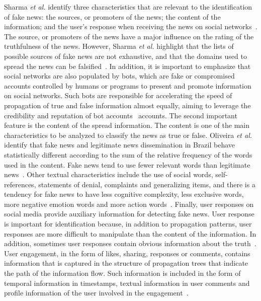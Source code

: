 \documentclass{ieeeaccess}
\begin{document}
Sharma {\it et al.} identify three characteristics that are relevant to the identification of fake news: the sources, or promoters of the news; the content of the information; and the user's response when receiving the news on social networks~\cite{sharma2019combating}. The source, or promoters of the news have a major influence on the rating of the truthfulness of the news. However, Sharma \textit{et al.} highlight that the lists of possible sources of fake news are not exhaustive, and that the domains used to spread the news can be falsified~\cite{sharma2019combating}. In addition, it is important to emphasize that social networks are also populated by bots, which are fake or compromised accounts controlled by humans or programs to present and promote information on social networks. Such bots are responsible for accelerating the speed of propagation of true and false information almost equally, aiming to leverage the credibility and reputation of bot accounts~\cite{botOrNot} accounts. The second important feature is the content of the spread information. The content is one of the main characteristics to be analyzed to classify the news as true or false. Oliveira {\it et al.} identify that fake news and legitimate news dissemination in Brazil behave statistically different according to the sum of the relative frequency of the words used in the content. Fake news tend to use fewer relevant words than legitimate news~\cite{nicollasspl2020}. Other textual characteristics include the use of social words, self-references, statements of denial, complaints and generalizing items, and there is a tendency for fake news to have less cognitive complexity, less exclusive words, more negative emotion words and more action words~\cite{sharma2019combating}. Finally, user responses on social media provide auxiliary information for detecting fake news. User response is important for identification because, in addition to propagation patterns, user responses are more difficult to manipulate than the content of the information. In addition, sometimes user responses contain obvious information about the truth~\cite{zhou2018fake}. User engagement, in the form of likes, sharing, responses or comments, contains information that is captured in the structure of propagation trees that indicate the path of the information flow. Such information is included in the form of temporal information in timestamps, textual information in user comments and profile information of the user involved in the engagement~\cite{sharma2019combating}.
\end{document}

